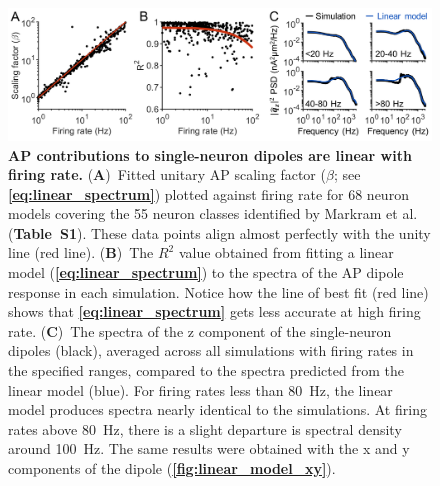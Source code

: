 \begin{figure}
	\centering
	\includegraphics[width=13.2cm]{Figures/chapter3/figure2.png}
    
    \caption{\textbf{AP contributions to single-neuron dipoles are linear with firing rate.} (\textbf{A})~Fitted unitary AP scaling factor ($\beta$; see \textbf{\ref{eq:linear_spectrum}}) plotted against firing rate for 68 neuron models covering the 55 neuron classes identified by Markram et al. \cite{Markram2015} (\textbf{Table~S1}). These data points align almost perfectly with the unity line (red line). (\textbf{B})~The $R^2$ value obtained from fitting a linear model (\textbf{\ref{eq:linear_spectrum}}) to the spectra of the AP dipole response in each simulation. Notice how the line of best fit (red line) shows that \textbf{\ref{eq:linear_spectrum}} gets less accurate at high firing rate. (\textbf{C})~The spectra of the z component of the single-neuron dipoles (black), averaged across all simulations with firing rates in the specified ranges, compared to the spectra predicted from the linear model (blue). For firing rates less than 80~\unit{\hertz}, the linear model produces spectra nearly identical to the simulations. At firing rates above 80~\unit{\hertz}, there is a slight departure is spectral density around 100~\unit{\hertz}. The same results were obtained with the x and y components of the dipole (\textbf{\autoref{fig:linear_model_xy}}).} 
    \label{fig:all_linear_model}
\end{figure}


